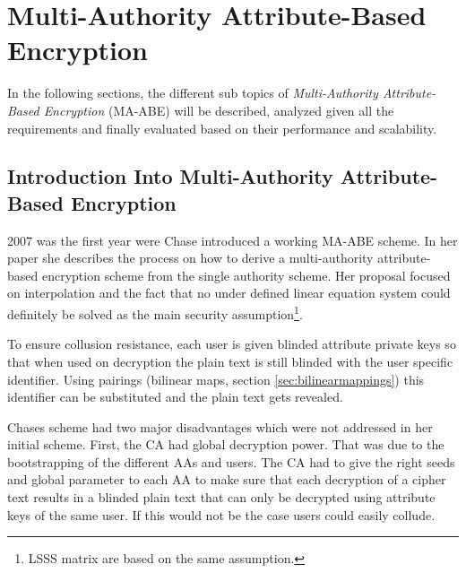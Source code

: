 \section{Multi-Authority Attribute-Based Encryption}
In the following sections, the different sub topics of \textit{Multi-Authority Attribute-Based Encryption} (\ac{MA-ABE}) will be described, analyzed given all the requirements and finally evaluated based on their performance and scalability. 

\subsection{Introduction Into Multi-Authority Attribute-Based Encryption}
2007 was the first year were Chase \cite{chase2007multi} introduced a working \ac{MA-ABE} scheme. In her paper she describes the process on how to derive a multi-authority attribute-based encryption scheme from the single authority scheme. Her proposal focused on interpolation and the fact that no under defined linear equation system could definitely be solved as the main security assumption\footnote{\ac{LSSS} matrix are based on the same assumption.}.  

To ensure collusion resistance, each user is given blinded attribute private keys so that when used on decryption the plain text is still blinded with the user specific identifier. Using pairings (bilinear maps, section \ref{sec:bilinearmappings}) this identifier can be substituted and the plain text gets revealed. 

Chases scheme had two major disadvantages which were not addressed in her initial scheme. First, the \ac{CA} had global decryption power. That was due to the bootstrapping of the different AAs and users. The CA had to give the right seeds and global parameter to each AA to make sure that each decryption of a cipher text results in a blinded plain text that can only be decrypted using attribute keys of the same user. If this would not be the case users could easily collude. 


